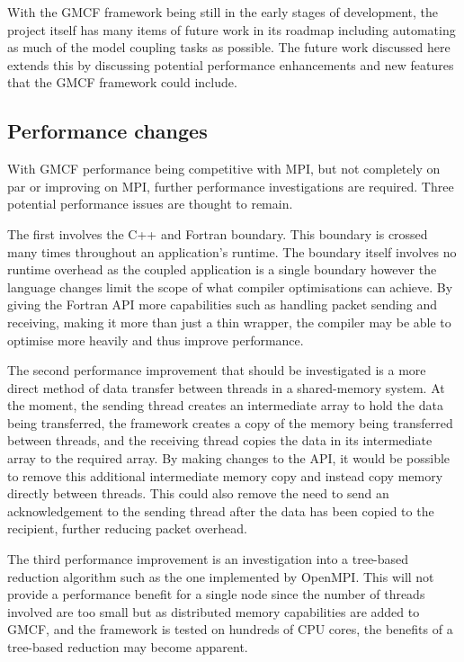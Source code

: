 With the GMCF framework being still in the early stages of development, the
project itself has many items of future work in its roadmap including automating
as much of the model coupling tasks as possible. The future work discussed here
extends this by discussing potential performance enhancements and new features
that the GMCF framework could include.

\subsection{Performance changes}

With GMCF performance being competitive with MPI, but not completely on par or
improving on MPI, further performance investigations are required. Three
potential performance issues are thought to remain.

The first involves the C++ and Fortran boundary. This boundary is crossed many
times throughout an application's runtime. The boundary itself involves no
runtime overhead as the coupled application is a single boundary however the
language changes limit the scope of what compiler optimisations can achieve. By
giving the Fortran API more capabilities such as handling packet sending and
receiving, making it more than just a thin wrapper, the compiler may be able to
optimise more heavily and thus improve performance.

The second performance improvement that should be investigated is a more direct
method of data transfer between threads in a shared-memory system. At the
moment, the sending thread creates an intermediate array to hold the data being
transferred, the framework creates a copy of the memory being transferred
between threads, and the receiving thread copies the data in its intermediate
array to the required array. By making changes to the API, it would be possible
to remove this additional intermediate memory copy and instead copy memory
directly between threads. This could also remove the need to send an
acknowledgement to the sending thread after the data has been copied to the
recipient, further reducing packet overhead.

The third performance improvement is an investigation into a tree-based
reduction algorithm such as the one implemented by OpenMPI. This will not
provide a performance benefit for a single node since the number of threads
involved are too small but as distributed memory capabilities are added to GMCF,
and the framework is tested on hundreds of CPU cores, the benefits of a
tree-based reduction may become apparent.

